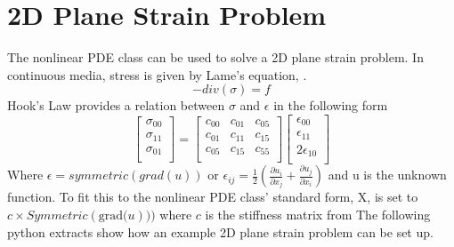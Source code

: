 \section{2D Plane Strain Problem}
The nonlinear PDE class can be used to solve a 2D plane strain problem. In continuous media, stress is given by Lame's equation, .
\begin{equation} 
-div(\sigma)=f
\label{symbolic eq2}
\end{equation} 
Hook's Law provides a relation between $\sigma$ and $\epsilon$ in the following form
\begin{equation}
\left[ \begin{array}{c}
\sigma_{00} \\
\sigma_{11} \\
\sigma_{01} \\
\end{array} \right] = 
\left[ \begin{array}{ccc}
c_{00} & c_{01} & c_{05}\\
c_{01} & c_{11} & c_{15}\\
c_{05} & c_{15} & c_{55}\\
\end{array}\right]
\left[ \begin{array}{c}
\epsilon_{00} \\
\epsilon_{11} \\
2\epsilon_{10} \\
\end{array} \right]
\label{symbolic eq3}
\end{equation}
Where $\epsilon = symmetric(grad(u)) \text{ or } \epsilon_{ij}=\frac{1}{2}\left(\frac{\partial u_i}{\partial x_j} + {\frac{\partial u_j}{\partial x_i}}\right)$ and 
u is the unknown function. To fit this to the nonlinear PDE class' standard form, X, is set to $c \times Symmetric(\text{grad(}u)))$ where $c$ is the stiffness matrix from 
The following python extracts show how an example 2D plane strain problem can be set up. 


